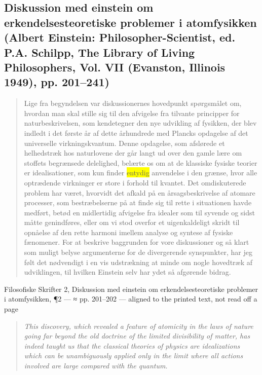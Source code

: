 \documentclass[11pt]{article}
\newcommand{\dcite}[1]{{\nopagebreak\raggedleft\small #1\par}\medskip}
\newcommand{\tlg}[1]{{\setlength{\fboxsep}{0.8pt}\colorbox{yellow}{#1}}}
\newcommand{\olg}[1]{{\setlength{\fboxsep}{0.8pt}\colorbox{cyan!25}{#1}}}
\begin{document}
\subsection{Diskussion med einstein om erkendelsesteoretiske problemer i atomfysikken \normalfont(Albert Einstein: Philosopher-Scientist, ed. P.A. Schilpp, The Library of Living Philosophers, Vol. VII (Evanston, Illinois 1949), pp. 201–241)}

\begin{quote}
Lige fra begyndelsen var diskussionernes hovedpunkt spørgsmålet om, hvordan man skal stille sig til den afvigelse fra tilvante principper for naturbeskrivelsen, som kendetegner den nye udvikling af fysikken, der blev indledt i det første år af dette århundrede med Plancks opdagelse af det universelle virkningskvantum. Denne opdagelse, som afslørede et helhedstræk hos naturlovene der går langt ud over den gamle lære om stoffets begrænsede delelighed, belærte os om at de klassiske fysiske teorier er idealisationer, som kun finder \tlg{entydig} anvendelse i den grænse, hvor alle optrædende virkninger er store i forhold til kvantet. Det omdiskuterede problem har været, hvorvidt det afkald på en årsagsbeskrivelse af atomare processer, som bestræbelserne på at finde sig til rette i situationen havde medført, betød en midlertidig afvigelse fra idealer som til syvende og sidst måtte genindføres, eller om vi stod overfor et uigenkaldeligt skridt til opnåelse af den rette harmoni imellem analyse og syntese af fysiske fænomener. For at beskrive baggrunden for vore diskussioner og så klart som muligt belyse argumenterne for de divergerende synspunkter, har jeg følt det nødvendigt i en vis udstrækning at minde om nogle hovedtræk af udviklingen, til hvilken Einstein selv har ydet så afgørende bidrag.
\end{quote}
\dcite{Filosofiske Skrifter 2, Diskussion med einstein om erkendelsesteoretiske problemer i atomfysikken, ¶2 — ≈ pp. 201–202 — aligned to the printed text, not read off a page}
{\footnotesize\begin{quote}\itshape
This discovery, which revealed a feature of atomicity in the laws of nature going far beyond the old doctrine of the limited divisibility of matter, has indeed taught us that the classical theories of physics are idealizations which can be \olg{unambiguously} applied only in the limit where all actions involved are large compared with the quantum.
\end{quote}}
\end{document}
